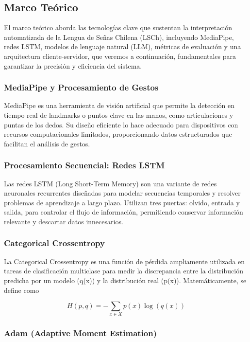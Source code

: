 \documentclass{article}
\begin{document}
\subsection{Marco Teórico}

El marco teórico aborda las tecnologías clave que sustentan la interpretación automatizada de la Lengua de Señas Chilena (LSCh), incluyendo MediaPipe, redes LSTM, modelos de lenguaje natural (LLM), métricas de evaluación y una arquitectura cliente-servidor, que veremos a continuación, fundamentales para garantizar la precisión y eficiencia del sistema.

\subsubsection{MediaPipe y Procesamiento de Gestos}

MediaPipe es una herramienta de visión artificial que permite la detección en tiempo real de landmarks o puntos clave en las manos, como articulaciones y puntas de los dedos. Su diseño eficiente lo hace adecuado para dispositivos con recursos computacionales limitados, proporcionando datos estructurados que facilitan el análisis de gestos. 

\subsubsection{Procesamiento Secuencial: Redes LSTM}

Las redes LSTM (Long Short-Term Memory) son una variante de redes neuronales recurrentes diseñadas para modelar secuencias temporales y resolver problemas de aprendizaje a largo plazo. Utilizan tres puertas: olvido, entrada y salida, para controlar el flujo de información, permitiendo conservar información relevante y descartar datos innecesarios.

\subsubsection{Categorical Crossentropy}

La Categorical Crossentropy es una función de pérdida ampliamente utilizada en tareas de clasificación multiclase para medir la discrepancia entre la distribución predicha por un modelo (q(x)) y la distribución real (p(x)). Matemáticamente, se define como

\[
H(p,q) = - \sum_{x \in X} p(x) \log(q(x))
\]

\subsubsection{Adam (Adaptive Moment Estimation)}
\end{document}
